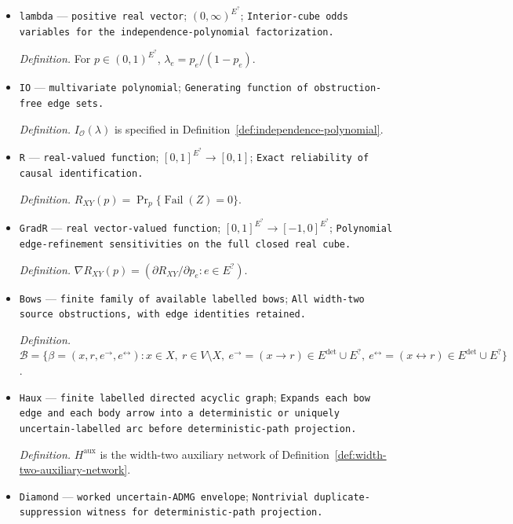 \documentclass{article}
\begin{document}
\begin{itemize}
  \par\smallskip\noindent\emph{Definition.} \(\mathcal T\) is a supplied decomposition certificate.
  \item \texttt{lambda} --- \texttt{positive real vector}; \((0,\infty)^{E^{?}}\); \texttt{Interior-\allowbreak{}cube odds variables for the independence-\allowbreak{}polynomial factorization.}
  \par\smallskip\noindent\emph{Definition.} For \(p\in(0,1)^{E^{?}}\), \(\lambda_e=p_e/(1-p_e)\).
  \item \texttt{IO} --- \texttt{multivariate polynomial}; \texttt{Generating function of obstruction-\allowbreak{}free edge sets.}
  \par\smallskip\noindent\emph{Definition.} \(I_{\mathcal O}(\lambda)\) is specified in Definition~\ref{def:independence-polynomial}.
  \item \texttt{R} --- \texttt{real-\allowbreak{}valued function}; \([0,1]^{E^{?}}\to[0,1]\); \texttt{Exact reliability of causal identification.}
  \par\smallskip\noindent\emph{Definition.} \(R_{XY}(p)=\Pr_p\{\operatorname{Fail}(Z)=0\}\).
  \item \texttt{GradR} --- \texttt{real vector-\allowbreak{}valued function}; \([0,1]^{E^{?}}\to[-1,0]^{E^{?}}\); \texttt{Polynomial edge-\allowbreak{}refinement sensitivities on the full closed real cube.}
  \par\smallskip\noindent\emph{Definition.} \(\nabla R_{XY}(p)=(\partial R_{XY}/\partial p_e:e\in E^{?})\).
  \item \texttt{Bows} --- \texttt{finite family of available labelled bows}; \texttt{All width-\allowbreak{}two source obstructions,\allowbreak{} with edge identities retained.}
  \par\smallskip\noindent\emph{Definition.} \(\mathcal B=\{\beta=(x,r,e^{\to},e^{\leftrightarrow}):x\in X,\ r\in V\setminus X,\ e^{\to}=(x\to r)\in E^{\mathrm{det}}\cup E^{?},\ e^{\leftrightarrow}=(x\leftrightarrow r)\in E^{\mathrm{det}}\cup E^{?}\}\).
  \item \texttt{Haux} --- \texttt{finite labelled directed acyclic graph}; \texttt{Expands each bow edge and each body arrow into a deterministic or uniquely uncertain-\allowbreak{}labelled arc before deterministic-\allowbreak{}path projection.}
  \par\smallskip\noindent\emph{Definition.} \(H^{\mathrm{aux}}\) is the width-two auxiliary network of Definition~\ref{def:width-two-auxiliary-network}.
  \item \texttt{Diamond} --- \texttt{worked uncertain-\allowbreak{}ADMG envelope}; \texttt{Nontrivial duplicate-\allowbreak{}suppression witness for deterministic-\allowbreak{}path projection.}

\end{itemize}
\end{document}

